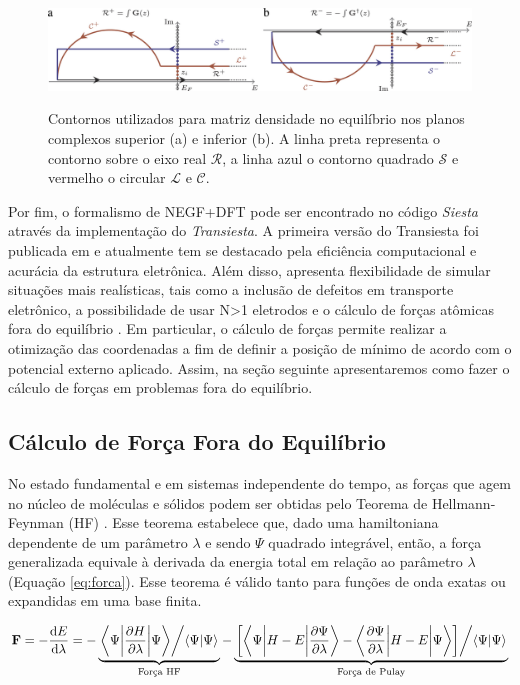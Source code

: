 \begin{figure}[h!]
	\centering
	\caption{Contornos utilizados para matriz densidade no equilíbrio nos planos complexos superior (a) e inferior (b). A linha preta representa o contorno sobre o eixo real $ \mathcal{R} $, a linha azul o contorno quadrado $ \mathcal{S} $ e vermelho o circular $ \mathcal{L}$ e $\mathcal{C} $.}
	\includegraphics[scale=1]{figs/contour_green.jpg}
	\label{fig:contour}
\end{figure} 

Por fim, o formalismo de NEGF+DFT pode ser encontrado no código \textit{Siesta} através da implementação do \textit{Transiesta}\cite{transiesta1,transiesta2,transiesta3}. A primeira versão do Transiesta foi publicada em \citeyear{transiesta1} e atualmente tem se destacado pela eficiência computacional e acurácia da estrutura eletrônica. Além disso, apresenta flexibilidade de simular situações mais realísticas, tais como a inclusão de defeitos em transporte eletrônico, a possibilidade de usar N>1 eletrodos e o cálculo de forças atômicas fora do equilíbrio \cite{transiesta4}. Em particular, o cálculo de forças permite realizar a otimização das coordenadas a fim de definir a posição de mínimo de acordo com o potencial externo aplicado. Assim, na seção seguinte apresentaremos como fazer o cálculo de forças em problemas fora do equilíbrio.


\subsection{Cálculo de Força Fora do Equilíbrio}
No estado fundamental e em sistemas independente do tempo, as forças que agem no núcleo de moléculas e sólidos podem ser obtidas pelo Teorema de Hellmann-Feynman (HF) \cite{forca-teo}\cite{forca-teo2}. Esse teorema estabelece que, dado uma hamiltoniana dependente de um parâmetro $ \lambda $ e sendo $ \Psi $ quadrado integrável, então, a força generalizada equivale à derivada da energia total em relação ao parâmetro $ \lambda $ (Equação \ref{eq:forca}). Esse teorema é válido tanto para funções de onda exatas ou expandidas em uma base finita.

\begin{equation}\label{eq:forca}
\vb{F}=-\dv{E}{\lambda}=-\underbrace{\flatfrac{\ev**{\pdv{H}{\lambda}}{\Psi}}{\braket{\Psi}{\Psi}}}_{\substack{\text{Força HF}}}-\underbrace{\flatfrac{\bqty{\mel**{\Psi}{H-E}{\pdv{\Psi}{\lambda}}-\mel**{\pdv{\Psi}{\lambda}}{H-E}{\Psi}}}{\braket{\Psi}{\Psi}}}_{\substack{\text{Força de Pulay}}}
\end{equation}

